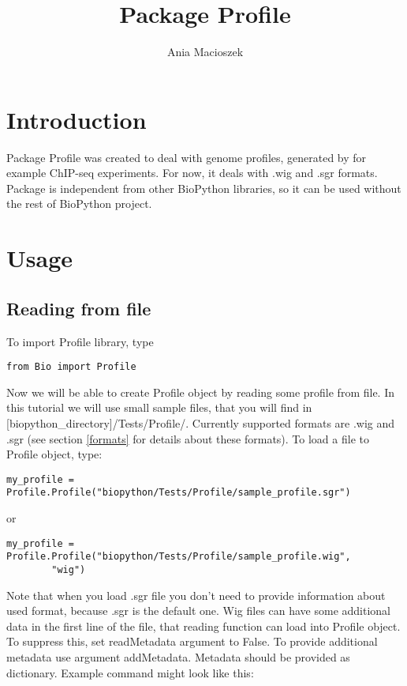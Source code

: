 \documentclass[a4paper,11pt,portrait]{article}
\title{Package Profile}
\author{Ania Macioszek}
\date{}
\begin{document}
\maketitle

\section{Introduction}

Package Profile was created to deal with genome profiles,
generated by for example ChIP-seq experiments.
For now, it deals with .wig and .sgr formats.
Package is independent from other BioPython libraries,
so it can be used without the rest of BioPython project.


\section{Usage}

\subsection{Reading from file}

To import Profile library, type

\begin{verbatim}
from Bio import Profile
\end{verbatim}

Now we will be able to create Profile object
by reading some profile from file.
In this tutorial we will use small sample files,
that you will find in [biopython\_directory]/Tests/Profile/.
Currently supported formats are .wig and .sgr
(see section \ref{formats} for details about these formats).
To load a file to Profile object, type:

\begin{verbatim}
my_profile = Profile.Profile("biopython/Tests/Profile/sample_profile.sgr")
\end{verbatim}

or

\begin{verbatim}
my_profile = Profile.Profile("biopython/Tests/Profile/sample_profile.wig",
		"wig")
\end{verbatim}

Note that when you load .sgr file you don't need to provide information about used format,
because .sgr is the default one.
Wig files can have some additional data in the first line of the file,
that reading function can load into Profile object.
To suppress this, set readMetadata argument to False.
To provide additional metadata use argument addMetadata.
Metadata should be provided as dictionary.
Example command might look like this:
\end{document}
